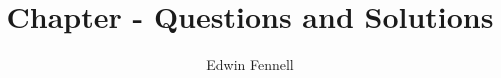 \documentclass{article}
\title{Chapter \chapternumber - Questions and Solutions}
\author{Edwin Fennell}
\date{}
\begin{document}
	
	\maketitle
	
	\noindent%
	
\end{document}
